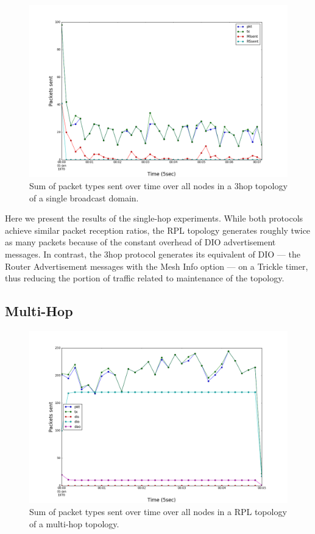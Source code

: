 \begin{figure}[t]
\centering
\includegraphics[width=\linewidth]{figs/3hop_single_hop.png}
\caption{Sum of packet types sent over time over all nodes in a 3hop topology of a single broadcast domain.}
\label{fig:3hop_single_hop}
\end{figure}


Here we present the results of the single-hop experiments.
While both protocols achieve similar packet reception ratios, the RPL topology generates roughly twice as many packets because of the constant overhead of DIO advertisement messages.
In contrast, the 3hop protocol generates its equivalent of DIO --- the Router Advertisement messages with the Mesh Info option --- on a Trickle timer, thus reducing the portion of traffic related to maintenance of the topology.

\subsection{Multi-Hop}

\begin{figure}[t]
\centering
\includegraphics[width=\linewidth]{figs/rpl_multi_hop.png}
\caption{Sum of packet types sent over time over all nodes in a RPL topology of a multi-hop topology.}
\label{fig:rpl_multi_hop}
\end{figure}


